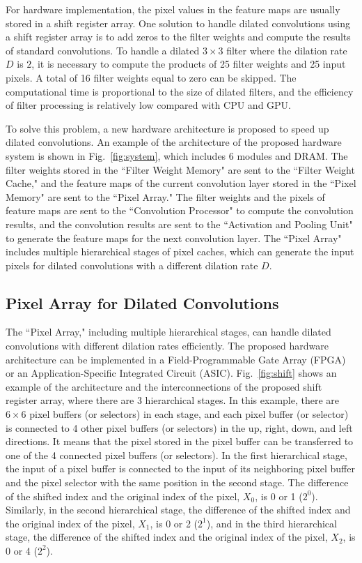 \documentclass[10pt,twocolumn,letterpaper]{article}
\begin{document}
For hardware implementation, the pixel values in the feature maps are usually stored in a shift register array. One solution to handle dilated convolutions using a shift register array is to add zeros to the filter weights and compute the results of standard convolutions. To handle a dilated $3 \times 3$ filter where the dilation rate $D$ is $2$, it is necessary to compute the products of 25 filter weights and 25 input pixels. A total of 16 filter weights equal to zero can be skipped. The computational time is proportional to the size of dilated filters, and the efficiency of filter processing is relatively low compared with CPU and GPU.

To solve this problem, a new hardware architecture is proposed to speed up dilated convolutions. An example of the architecture of the proposed hardware system is shown in Fig.~\ref{fig:system}, which includes 6 modules and DRAM. The filter weights stored in the ``Filter Weight Memory" are sent to the ``Filter Weight Cache," and the feature maps of the current convolution layer stored in the ``Pixel Memory" are sent to the ``Pixel Array." The filter weights and the pixels of feature maps are sent to the ``Convolution Processor" to compute the convolution results, and the convolution results are sent to the ``Activation and Pooling Unit" to generate the feature maps for the next convolution layer. The ``Pixel Array" includes multiple hierarchical stages of pixel caches, which can generate the input pixels for dilated convolutions with a different dilation rate $D$.


\subsection{Pixel Array for Dilated Convolutions}
\label{subsec:shift}

The ``Pixel Array," including multiple hierarchical stages, can handle dilated convolutions with different dilation rates efficiently. The proposed hardware architecture can be implemented in a Field-Programmable Gate Array (FPGA) or an Application-Specific Integrated Circuit (ASIC). Fig.~\ref{fig:shift} shows an example of the architecture and the interconnections of the proposed shift register array, where there are 3 hierarchical stages. In this example, there are $6 \times 6$ pixel buffers (or selectors) in each stage, and each pixel buffer (or selector) is connected to 4 other pixel buffers (or selectors) in the up, right, down, and left directions. It means that the pixel stored in the pixel buffer can be transferred to one of the 4 connected pixel buffers (or selectors). In the first hierarchical stage, the input of a pixel buffer is connected to the input of its neighboring pixel buffer and the pixel selector with the same position in the second stage. The difference of the shifted index and the original index of the pixel, $X_{0}$, is 0 or 1 ($2^0$). Similarly, in the second hierarchical stage, the difference of the shifted index and the original index of the pixel, $X_{1}$, is 0 or 2 ($2^1$), and in the third hierarchical stage, the difference of the shifted index and the original index of the pixel, $X_{2}$, is 0 or 4 ($2^2$).
\end{document}
